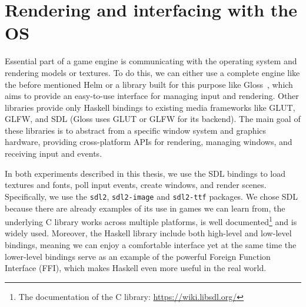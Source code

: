 \documentclass[
  digital, %
  color,   %
  table,   %
  oneside, %
  lof,     %
  lot,     %
]{fithesis3}
\newcommand{\packagename}{\texttt}
\begin{document}
\section{Rendering and interfacing with the OS}
\label{sect:aboutsdl}
Essential part of a game engine is communicating with the operating system
and rendering models or textures. To do this, we can
either use a complete engine like the before mentioned Helm or
a library built for this purpose like Gloss~\cite{glossrepo}, which aims to provide an easy-to-use
interface for managing input and rendering. Other libraries
provide only Haskell bindings to existing media frameworks like GLUT, GLFW, and SDL
(Gloss uses GLUT or GLFW for its backend). The main goal of these libraries is
to abstract from a specific window system and graphics hardware, providing
cross-platform APIs for rendering, managing windows, and receiving input and events.

In both experiments described in this thesis, we use the SDL bindings
to load textures and fonts, poll input events, create windows, and render scenes.
Specifically, we use the \packagename{sdl2}, \packagename{sdl2-image}
and \packagename{sdl2-ttf} packages. We chose SDL because there are already
examples of its use in games we can learn from,
the underlying C library works across multiple platforms,
is well documented\footnote{
    The documentation of the C library: \url{https://wiki.libsdl.org/}
} and is widely used. Moreover, the Haskell library
include both high-level and low-level bindings, meaning we can
enjoy a comfortable interface yet at the same time the
lower-level bindings serve as an example of
the powerful Foreign Function Interface (FFI), which
makes Haskell even more useful in the real world.
\end{document}
